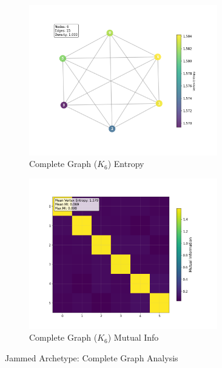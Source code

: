 \documentclass[12pt, letterpaper]{article}
\begin{document}
\begin{figure}[H]
    \centering
    \begin{subfigure}[b]{0.48\textwidth}
        \includegraphics[width=0.9\textwidth]{images/Graph Visualizations/Jammed/Complete_Graph_Vertex_Entropy.png}
        \caption{Complete Graph ($K_6$) Entropy}
        \label{fig:complete_entropy}
    \end{subfigure}
    \hfill
    \begin{subfigure}[b]{0.48\textwidth}
        \includegraphics[width=0.9\textwidth]{images/Graph Visualizations/Jammed/Complete_Graph_MI_Matrix.png}
        \caption{Complete Graph ($K_6$) Mutual Info}
        \label{fig:complete_mi}
    \end{subfigure}
    \caption{Jammed Archetype: Complete Graph Analysis}
    \label{fig:complete_analysis}
\end{figure}
\end{document}
